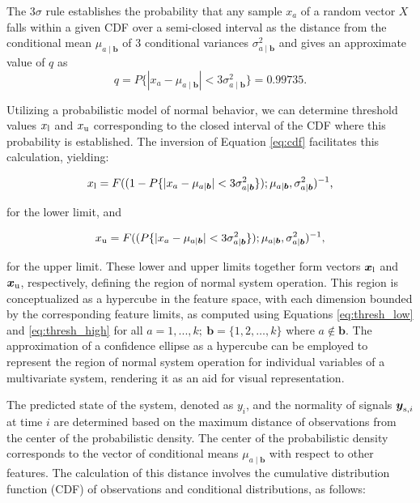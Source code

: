 The \(3\sigma\) rule establishes the probability that any sample \(x_a\) of a random vector \({X}\) falls within a given CDF over a semi-closed interval as the distance from the conditional mean \(\mu_{a \mid \boldsymbol{b}} \) of 3 conditional variances \(\sigma_{a \mid \boldsymbol{b}}^2\) and gives an approximate value of $q$ as
\begin{equation}
q=P\{|x_a-\mu_{a \mid \boldsymbol{b}} |<3\sigma_{a \mid \boldsymbol{b}}^2\}=0.99735
\text{.}\label{eq:q}
\end{equation}

Utilizing a probabilistic model of normal behavior, we can determine threshold values ${x _{\text{l}}}$ and ${x _{\text{u}}}$ corresponding to the closed interval of the CDF where this probability is established. The inversion of Equation \eqref{eq:cdf} facilitates this calculation, yielding:

\begin{equation}
{x _{\text{l}}} = F((1 - P\{|x_a-\mu_{a \mid \boldsymbol{b}}|<3\sigma_{a \mid \boldsymbol{b}}^2\}); \mu_{a \mid \boldsymbol{b}}, \sigma_{a \mid \boldsymbol{b}}^2)^{-1}\text{,}\label{eq:thresh_low}
\end{equation}

for the lower limit, and

\begin{equation}
{x _{\text{u}}} = F((P\{|x_a-\mu_{a \mid \boldsymbol{b}}|<3\sigma_{a \mid \boldsymbol{b}}^2\}); \mu_{a \mid \boldsymbol{b}}, \sigma_{a \mid \boldsymbol{b}}^2)^{-1}\text{,}\label{eq:thresh_high}
\end{equation}

for the upper limit. These lower and upper limits together form vectors $\boldsymbol{x _{\text{l}}}$ and $\boldsymbol{x _{\text{u}}}$, respectively, defining the region of normal system operation. This region is conceptualized as a hypercube in the feature space, with each dimension bounded by the corresponding feature limits, as computed using Equations \eqref{eq:thresh_low} and \eqref{eq:thresh_high} for all $a = 1,...,k;~ \boldsymbol{b} = \{1, 2, \ldots, k\}$ where $a \notin \boldsymbol{b}$. The approximation of a confidence ellipse as a hypercube can be employed to represent the region of normal system operation for individual variables of a multivariate system, rendering it as an aid for visual representation.

The predicted state of the system, denoted as $y_i$, and the normality of signals $\boldsymbol{y} _{\text{s}, i}$ at time $i$ are determined based on the maximum distance of observations from the center of the probabilistic density. The center of the probabilistic density corresponds to the vector of conditional means $\mu_{a \mid \boldsymbol{b}}$ with respect to other features. The calculation of this distance involves the cumulative distribution function (CDF) of observations and conditional distributions, as  follows:

